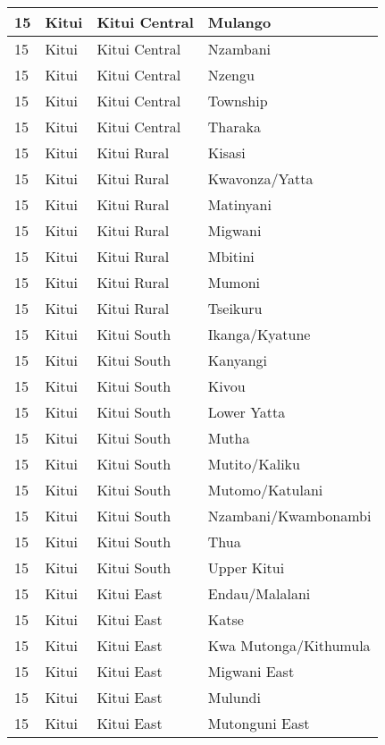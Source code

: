 \begin{table}[!ht]
\begin{tabular}{|l|l|l|l|}
        15 & Kitui & Kitui Central & Mulango \\ \hline
        15 & Kitui & Kitui Central & Nzambani \\ \hline
        15 & Kitui & Kitui Central & Nzengu \\ \hline
        15 & Kitui & Kitui Central & Township \\ \hline
        15 & Kitui & Kitui Central & Tharaka \\ \hline
        15 & Kitui & Kitui Rural & Kisasi \\ \hline
        15 & Kitui & Kitui Rural & Kwavonza/Yatta \\ \hline
        15 & Kitui & Kitui Rural & Matinyani \\ \hline
        15 & Kitui & Kitui Rural & Migwani \\ \hline
        15 & Kitui & Kitui Rural & Mbitini \\ \hline
        15 & Kitui & Kitui Rural & Mumoni \\ \hline
        15 & Kitui & Kitui Rural & Tseikuru \\ \hline
        15 & Kitui & Kitui South & Ikanga/Kyatune \\ \hline
        15 & Kitui & Kitui South & Kanyangi \\ \hline
        15 & Kitui & Kitui South & Kivou \\ \hline
        15 & Kitui & Kitui South & Lower Yatta \\ \hline
        15 & Kitui & Kitui South & Mutha \\ \hline
        15 & Kitui & Kitui South & Mutito/Kaliku \\ \hline
        15 & Kitui & Kitui South & Mutomo/Katulani \\ \hline
        15 & Kitui & Kitui South & Nzambani/Kwambonambi \\ \hline
        15 & Kitui & Kitui South & Thua \\ \hline
        15 & Kitui & Kitui South & Upper Kitui \\ \hline
        15 & Kitui & Kitui East & Endau/Malalani \\ \hline
        15 & Kitui & Kitui East & Katse \\ \hline
        15 & Kitui & Kitui East & Kwa Mutonga/Kithumula \\ \hline
        15 & Kitui & Kitui East & Migwani East \\ \hline
        15 & Kitui & Kitui East & Mulundi \\ \hline
        15 & Kitui & Kitui East & Mutonguni East \\ \hline

\end{tabular}
\end{table}
